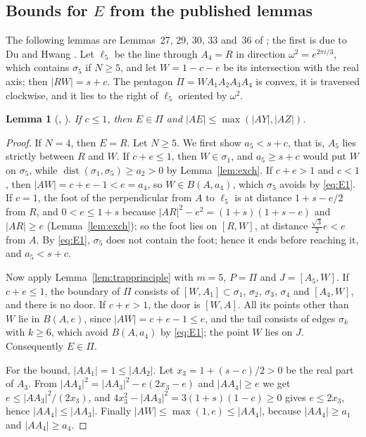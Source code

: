 \documentclass[11pt]{amsart}
\newtheorem{lemma}[theorem]{Lemma}
\theoremstyle{definition}
\theoremstyle{remark}
\numberwithin{equation}{section}
\newcommand{\dist}{\operatorname{dist}}
\begin{document}
\subsection{\texorpdfstring{Bounds for $E$ from the published lemmas}{Bounds for E from the published lemmas}}
The following lemmas are Lemmas~27, 29, 30, 33 and~36 of \cite{KHSHGW}; the first is due to Du and Hwang \cite[Lemma~2]{DH83}. Let $\ell_5$ be the line through $A_4=R$ in direction $\omega^2=e^{2\pi i/3}$, which contains $\sigma_5$ if $N\ge5$, and let $W=1-c-e$ be its intersection with the real axis; then $|RW|=s+c$. The pentagon $\Pi=WA_1A_2A_3A_4$ is convex, it is traversed clockwise, and it lies to the right of $\ell_5$ oriented by $\omega^2$.

\begin{lemma}[{\cite[Lemma~2]{DH83}, \cite[Lemma~27]{KHSHGW}}]\label{lem:L0}
If $c\le1$, then $E\in\Pi$ and $|AE|\le\max(|AY|,|AZ|)$.
\end{lemma}

\begin{proof}
If $N=4$, then $E=R$. Let $N\ge5$. We first show $a_5<s+c$, that is, $A_5$ lies strictly between $R$ and $W$. If $c+e\le1$, then $W\in\sigma_1$, and $a_5\ge s+c$ would put $W$ on $\sigma_5$, while $\dist(\sigma_1,\sigma_5)\ge a_2>0$ by Lemma~\ref{lem:exch}. If $c+e>1$ and $c<1$, then $|AW|=c+e-1<e=a_4$, so $W\in B(A,a_4)$, which $\sigma_5$ avoids by \eqref{eq:E1}. If $c=1$, the foot of the perpendicular from $A$ to $\ell_5$ is at distance $1+s-e/2$ from $R$, and $0<e\le1+s$ because $|AR|^2-e^2=(1+s)(1+s-e)$ and $|AR|\ge e$ (Lemma~\ref{lem:exch}); so the foot lies on $[R,W]$, at distance $\frac{\sqrt3}2e<e$ from $A$. By \eqref{eq:E1}, $\sigma_5$ does not contain the foot; hence it ends before reaching it, and $a_5<s+c$.

Now apply Lemma~\ref{lem:trapprinciple} with $m=5$, $P=\Pi$ and $J=[A_5,W]$. If $c+e\le1$, the boundary of $\Pi$ consists of $[W,A_1]\subset\sigma_1$, $\sigma_2$, $\sigma_3$, $\sigma_4$ and $[A_4,W]$, and there is no door. If $c+e>1$, the door is $[W,A]$. All its points other than $W$ lie in $B(A,e)$, since $|AW|=c+e-1\le e$, and the tail consists of edges $\sigma_k$ with $k\ge6$, which avoid $B(A,a_4)$ by \eqref{eq:E1}; the point $W$ lies on $J$. Consequently $E\in\Pi$.

For the bound, $|AA_1|=1\le|AA_2|$. Let $x_3=1+(s-c)/2>0$ be the real part of $A_3$. From $|AA_4|^2=|AA_3|^2-e(2x_3-e)$ and $|AA_4|\ge e$ we get $e\le|AA_3|^2/(2x_3)$, and $4x_3^2-|AA_3|^2=3(1+s)(1-c)\ge0$ gives $e\le2x_3$, hence $|AA_4|\le|AA_3|$. Finally $|AW|\le\max(1,e)\le|AA_4|$, because $|AA_4|\ge a_1$ and $|AA_4|\ge a_4$.
\end{proof}
\end{document}
